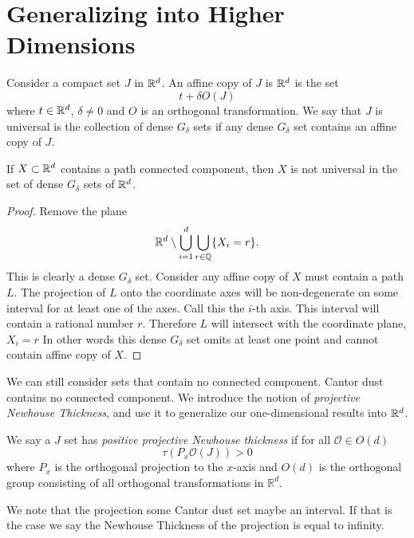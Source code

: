 \section{Generalizing into Higher Dimensions}

Consider a compact set $J$ in $\mathbb{R}^d$. An affine copy of $J$ is $\mathbb{R}^d$ is the set 
$$
t+\delta O (J)
$$
where $t\in \mathbb{R}^d$, $\delta\ne 0$ and $O$ is an orthogonal transformation. We say that $J$ is universal is the collection of dense $G_{\delta}$ sets if any dense $G_{\delta}$ set contains an affine copy of $J$. 
\begin{theorem}
    If $X\subset \mathbb{R}^d$ contains a path connected component, then $X$ is not universal in the set of dense $G_\delta$ sets of $\mathbb{R}^d$.  
\end{theorem}
\begin{proof}
    Remove the plane 
    $$
    \mathbb{R}^d \setminus \bigcup_{i=1}^d \bigcup_{r \in \mathbb{Q}} \{X_i = r \}.
    $$
    This is clearly a dense $G_{\delta}$ set. 
    Consider any affine copy of $X$ must contain a path $L$.   The projection of $L$ onto the coordinate axes will be non-degenerate on some interval for at least one of the axes.  Call this the $i$-th axis.  This interval will contain a rational number $r$.  Therefore $L$ will intersect with the coordinate plane, $X_i = r$ 
    In other words this dense $G_{\delta}$ set omits at least one point and cannot contain affine copy of $X$.  
\end{proof}
 We can still consider sets that contain no connected component.  Cantor dust contains no connected component.  We introduce the notion of \textit{projective Newhouse Thickness}, and use it to generalize our one-dimensional results into $\mathbb{R}^d$.  
\begin{definition}
    We say a $J$ set has {\it positive projective Newhouse thickness} if for all ${\mathcal O} \in O(d)$ 
$$
 \tau(P_x{\mathcal O}(J)) > 0
$$
where $P_x$ is the orthogonal projection to the $x$-axis and $O(d)$ is the orthogonal group consisting of all orthogonal transformations in ${\mathbb R}^d$.  
\end{definition}

We note that the projection some Cantor dust set maybe an interval.  If that is the case we say the Newhouse Thickness of the projection is equal to infinity.  

